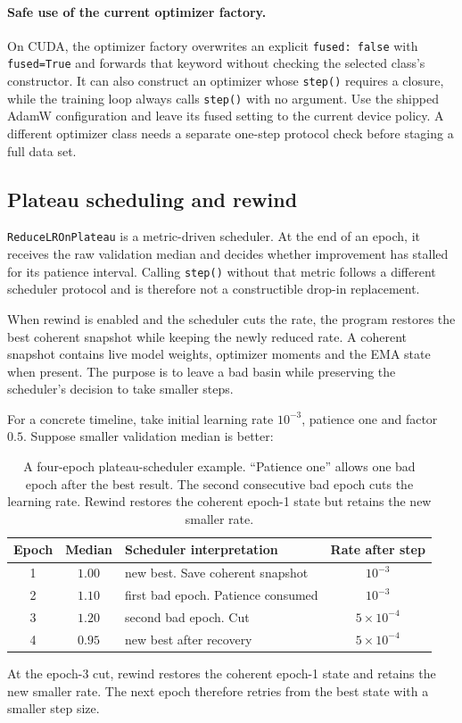 \documentclass[10pt,aps,prd,twocolumn,nofootinbib]{revtex4-2}
\newcommand{\code}[1]{\texttt{#1}}
\begin{document}
\paragraph{Safe use of the current optimizer factory.}
On CUDA, the optimizer factory overwrites an explicit \code{fused: false} with
\code{fused=True} and forwards that keyword without checking the selected
class's constructor.  It can also construct an optimizer whose \code{step()}
requires a closure, while the training loop always calls \code{step()} with no
argument.  Use the shipped AdamW configuration and leave its fused setting to
the current device policy.  A different optimizer class needs a separate
one-step protocol check before staging a full data set.

\subsection{Plateau scheduling and rewind}

\code{ReduceLROnPlateau} is a metric-driven scheduler.  At the end of an
epoch, it receives the raw validation median and decides whether improvement
has stalled for its patience interval.  Calling \code{step()} without that
metric follows a different scheduler protocol and is therefore not a
constructible drop-in replacement.

When rewind is enabled and the scheduler cuts the rate, the program restores
the best coherent snapshot while keeping the newly reduced rate.  A coherent
snapshot contains live model weights, optimizer moments and the EMA state
when present.  The purpose is to leave a bad basin while preserving the
scheduler's decision to take smaller steps.

For a concrete timeline, take initial learning rate $10^{-3}$, patience one
and factor $0.5$.  Suppose smaller validation median is better:
\begin{table}[t]
\centering
\begin{tabular}{c@{\qquad}c@{\qquad}l@{\qquad}c}
\toprule
Epoch & Median & Scheduler interpretation & Rate after step \\
\midrule
1 & $1.00$ & new best.  Save coherent snapshot & $10^{-3}$ \\
2 & $1.10$ & first bad epoch.  Patience consumed & $10^{-3}$ \\
3 & $1.20$ & second bad epoch.  Cut & $5\times10^{-4}$ \\
4 & $0.95$ & new best after recovery & $5\times10^{-4}$ \\
\bottomrule
\end{tabular}
\caption{A four-epoch plateau-scheduler example.  ``Patience one'' allows one
bad epoch after the best result.  The second consecutive bad epoch cuts the
learning rate.  Rewind restores the coherent epoch-1 state but retains the
new smaller rate.}
\label{tab:plateau-timeline}
\end{table}
At the epoch-3 cut, rewind restores the coherent epoch-1 state and retains the
new smaller rate.  The next epoch therefore retries from the best state with a
smaller step size.
\end{document}
